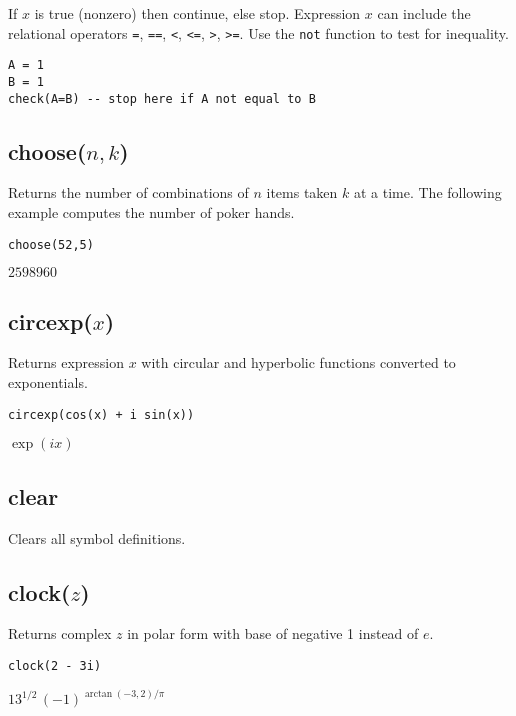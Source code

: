 If $x$ is true (nonzero) then continue, else stop.
Expression $x$ can include the relational operators
\verb$=$,
\verb$==$,
\verb$<$,
\verb$<=$,
\verb$>$,
\verb$>=$.
Use the
\verb$not$
function to test for inequality.

{\color{blue}
\begin{verbatim}
A = 1
B = 1
check(A=B) -- stop here if A not equal to B
\end{verbatim}
}

\subsection*{choose($n,k$)}

Returns the number of combinations of $n$ items taken $k$ at a time.
The following example computes the number of poker hands.

{\color{blue}
\begin{verbatim}
choose(52,5)
\end{verbatim}
}

\noindent
$2598960$

\subsection*{circexp($x$)}

Returns expression $x$ with circular and hyperbolic functions
converted to exponentials.

{\color{blue}
\begin{verbatim}
circexp(cos(x) + i sin(x))
\end{verbatim}
}

\noindent
$\exp(ix)$

\subsection*{clear}

Clears all symbol definitions.

\subsection*{clock($z$)}

Returns complex $z$ in polar form with base of negative 1 instead of $e$.

{\color{blue}
\begin{verbatim}
clock(2 - 3i)
\end{verbatim}
}

\noindent
$13^{1/2}\,(-1)^{\arctan(-3,2)/\pi}$

